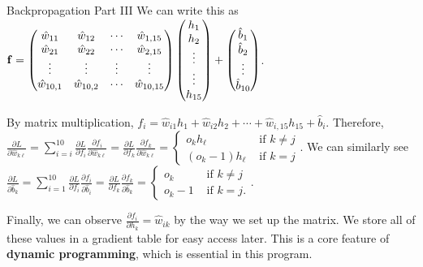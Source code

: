 \documentclass[xcolor=dvipsnames, fontsize=11pt, %
pagesize, %
parskip=half-, t]{beamer}
\begin{document}
\begin{frame}{Backpropagation Part III}
We can write this as $\bold{f}=\begin{pmatrix} \hat{w}_{11} & \hat{w}_{12} & \cdots & \hat{w}_{1,15} \\ \hat{w}_{21} & \hat{w}_{22} & \cdots & \hat{w}_{2,15} \\ \vdots & \vdots & \vdots & \vdots \\ \hat{w}_{10,1} & \hat{w}_{10,2} & \cdots & \hat{w}_{10,15} \end{pmatrix}\begin{pmatrix} h_{1} \\ h_2 \\ \vdots \\ \vdots \\ h_{15} \end{pmatrix}+\begin{pmatrix} \hat{b}_{1} \\ \hat{b}_2 \\ \vdots \\ \hat{b}_{10} \end{pmatrix}$. \vspace{0.025\textheight} \pause 

By matrix multiplication, $f_i=\hat{w}_{i1}h_1+\hat{w}_{i2}h_2+\cdots+\hat{w}_{i,15}h_{15}+\hat{b}_i$. \pause Therefore, $\displaystyle \frac{\partial L}{\partial \hat{w}_{k\ell}}=\sum_{i=i}^{10} \frac{\partial L}{\partial f_i}\frac{\partial f_i}{\partial \hat{w}_{k\ell }}=\frac{\partial L}{\partial f_k}\frac{\partial f_k}{\partial \hat{w}_{k\ell}}=\begin{cases} o_kh_{\ell} & \text{ if } k\neq j \\ 
\left(o_k-1\right)h_{\ell} & \text{ if } k=j \end{cases}$. \pause We can similarly see $\displaystyle \frac{\partial L}{\partial \hat{b}_k}=\sum_{i=1}^{10} \frac{\partial L}{\partial f_i}\frac{\partial f_i}{\partial \hat{b}_i}=\frac{\partial L}{\partial f_k}\frac{\partial f_k}{\partial \hat{b}_k}=\begin{cases} o_k & \text{ if } k\neq j \\ o_k-1&  \text{ if } k=j. \end{cases}$. \pause \vspace{0.025\textheight}

Finally, we can observe $\frac{\partial f_i}{\partial h_k}=\hat{w}_{ik}$ by the way we set up the matrix. We store all of these values in a gradient table for easy access later. This is a core feature of \textbf{dynamic programming}, which is essential in this program.
\end{frame}
\end{document}
